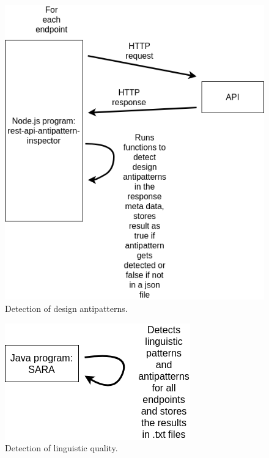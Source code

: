 \documentclass[a4paper,12pt]{article}
\begin{document}
\begin{figure}[ht!]
    \centering
    \includegraphics[scale=0.5]{Template_report_LaTeX_EN/img/method_figures/rest-api-antipattern-inspector.png}
    \caption{Detection of design antipatterns.}
    \label{fig:Detection of design antipatterns}
\end{figure}

\begin{figure}[ht!]
    \centering
    \includegraphics[scale=0.5]{Template_report_LaTeX_EN/img/method_figures/JAVA_SARA.png}
    \caption{Detection of linguistic quality.}
    \label{fig:Detection of linguistic quality}
\end{figure}
\end{document}
